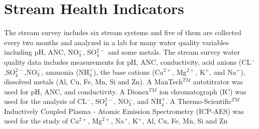 \section{Stream Health Indicators}
The stream survey includes six stream systems and five of them are collected every two months and analyzed in a lab for many water quality variables including pH, ANC, NO$_3^-$, SO$_4^{2-}$ and some metals.  %
The stream survey water quality data includes measurements for pH, ANC, conductivity, acid anions (CL$^-$,SO$_4^{2-}$,NO$_3^-$, ammonia (NH$_4^+$), the base cations (Ca$^{2+}$, Mg$^{2+}$, K$^+$, and Na$^+$), dissolved metals (Al, Cu, Fe, Mn, Si and Zn).  
A ManTech$^{TM}$ autotitrator was used for pH, ANC, and conductivity.  
A Dionex$^{TM}$ ion chromatograph (IC) was used for the analysis of CL$^-$, SO$_4^{2-}$, NO$_3^-$, and NH$_4^+$.  A Thermo-Scientific$^{TM}$ Inductively Coupled Plasma - Atomic Emission Spectrometry (ICP-AES) was used for the study of Ca$^{2+}$, Mg$^{2+}$, Na$^+$, K$^+$, Al, Cu, Fe, Mn, Si and Zn